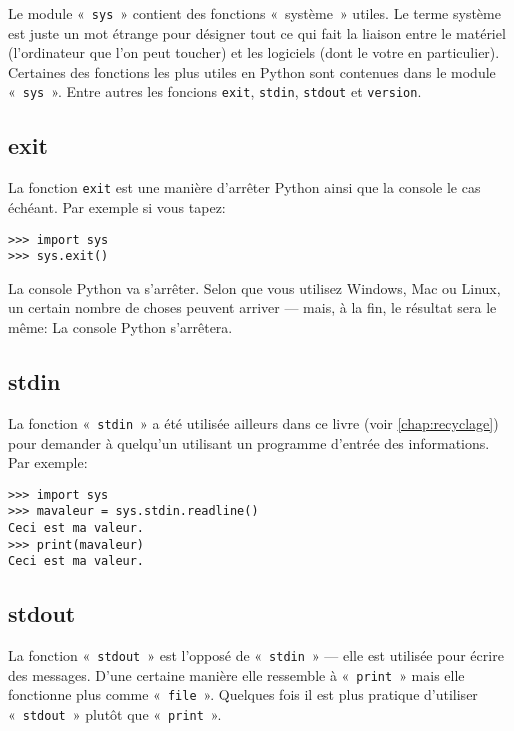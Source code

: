 Le module « \verb+sys+ » contient des fonctions « système » utiles. Le terme système est juste un mot étrange pour désigner tout ce qui fait la liaison entre le matériel (l'ordinateur que l'on peut toucher) et les logiciels (dont le votre en particulier). Certaines des fonctions les plus utiles en Python sont contenues dans le module « \texttt{sys} ». Entre autres les foncions \verb+exit+, \verb+stdin+, \verb+stdout+ et \verb+version+.
\subsection{exit}

La fonction \verb+exit+ est une manière d'arrêter Python ainsi que la console le cas échéant. Par exemple si vous tapez:

\begin{Verbatim}[frame=single,rulecolor=\color{gray}]
>>> import sys
>>> sys.exit()
\end{Verbatim}

La console Python va s'arrêter. Selon que vous utilisez Windows, Mac ou Linux, un certain nombre de choses peuvent arriver --- mais, à la fin, le résultat sera le même: La console Python s'arrêtera.
\subsection{stdin}

La fonction « \verb+stdin+ » a été utilisée ailleurs dans ce livre (voir \autoref{chap:recyclage}) pour demander à quelqu'un utilisant un programme d'entrée des informations. Par exemple:

\begin{Verbatim}[frame=single,rulecolor=\color{gray}]
>>> import sys
>>> mavaleur = sys.stdin.readline()
Ceci est ma valeur.
>>> print(mavaleur)
Ceci est ma valeur.
\end{Verbatim}
\subsection{stdout}

La fonction « \verb+stdout+ » est l'opposé de « \texttt{stdin} » --- elle est utilisée pour écrire des messages. D'une certaine manière elle ressemble à « \texttt{print} » mais elle fonctionne plus comme « \texttt{file} ». Quelques fois il est plus pratique d'utiliser « \texttt{stdout} » plutôt que « \texttt{print} ».

